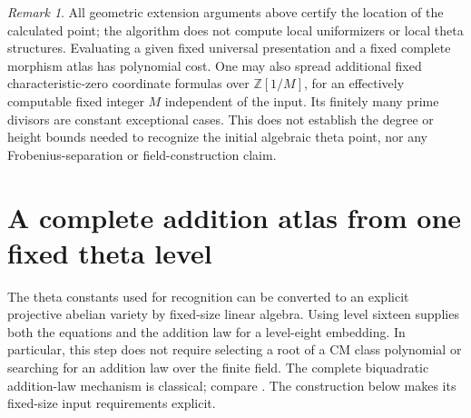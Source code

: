\documentclass[11pt]{article}
\theoremstyle{definition}
\theoremstyle{remark}
\newtheorem{remark}[theorem]{Remark}
\begin{document}
\begin{remark}\label{rem:kummer-fixed-theta-denominators}
All geometric extension arguments above certify the location
of the calculated point; the algorithm does not compute local
uniformizers or local theta structures.  Evaluating a given
fixed universal presentation and a fixed complete morphism atlas
has polynomial cost.  One may also spread additional fixed
characteristic-zero coordinate formulas over
\(\mathbb Z[1/M]\), for an effectively computable fixed integer
\(M\) independent of the input.  Its finitely many prime divisors
are constant exceptional cases.  This does not establish the
degree or height bounds needed to recognize the initial algebraic
theta point, nor any Frobenius-separation or field-construction
claim.
\end{remark}

\section{A complete addition atlas from one fixed theta level}
\label{sec:theta-model-atlas}

The theta constants used for recognition can be converted to an
explicit projective abelian variety by fixed-size linear algebra.
Using level sixteen supplies both the equations and the addition law
for a level-eight embedding. In particular, this step does not require
selecting a root of a CM class polynomial or searching for an addition
law over the finite field. The complete biquadratic addition-law
mechanism is classical; compare
\citet[Proposition~2.2 and Lemma~2.4, pp.~310--312]{AreneKohelRitzenthaler2012}.
The construction below makes its fixed-size input requirements explicit.
\end{document}
